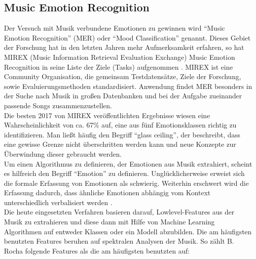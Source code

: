 \documentclass[11pt,a4paper]{article}
\begin{document}
\subsection{Music Emotion Recognition}
Der Versuch mit Musik verbundene Emotionen zu gewinnen wird ``Music Emotion Recognition'' (MER) oder ``Mood Classification'' genannt. Dieses Gebiet der Forschung hat in den letzten Jahren mehr Aufmerksamkeit erfahren, so hat MIREX (Music Information Retrieval Evaluation Exchange) Music Emotion Recognition in seine Liste der Ziele (Tasks) aufgenommen \cite{dadf933477b66ec1591840023fc37ac83b3e10d5aa4fd440639abca907d805ba}. MIREX ist eine Community Organisation, die gemeinsam Testdatensätze, Ziele der Forschung, sowie Evaluierungsmethoden standardisiert.
Anwendung findet MER besonders in der Suche nach Musik in großen Datenbanken und bei der Aufgabe zueinander passende Songs zusammenzustellen.\\Die besten 2017 von MIREX veröffentlichten Ergebnisse wiesen eine Wahrscheinlichkeit von ca. 67\% auf, eine aus fünf Emotionsklassen richtig zu identifizieren\cite{mirex_results_2017}. Man ließt häufig den Begriff ``glass ceiling'', der beschreibt, dass eine gewisse Grenze nicht überschritten werden kann und neue Konzepte zur Überwindung dieser gebraucht werden.\\
Um einen Algorithmus zu definieren, der Emotionen aus Musik extrahiert, scheint es hilfreich den Begriff ``Emotion'' zu definieren. Unglücklicherweise erweist sich die formale Erfassung von Emotionen als schwierig. Weiterhin erschwert wird die Erfassung dadurch, dass ähnliche Emotionen abhängig vom Kontext unterschiedlich verbalisiert werden \cite[S. 158]{lerch2012introduction}.\\
Die heute eingesetzten Verfahren basieren darauf, Lowlevel-Features aus der Musik zu extrahieren und diese dann mit Hilfe von Machine Learning Algorithmen auf entweder Klassen oder ein Modell abzubilden. Die am häufigsten benutzten Features beruhen auf spektralen Analysen der Musik. So zählt B. Rocha \cite{43334da08db3748e0a566e71fbb76d92cf6f15f35575908aa975b0b2baddab5b} folgende Features als die am häufigsten benutzten auf:
\end{document}
